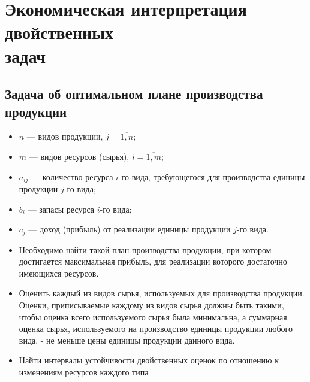 \documentclass[17pt]{extarticle}
\begin{document}
\section{Экономическая интерпретация двойственных \\ задач}
\subsection{Задача об оптимальном плане производства продукции}
\begin{itemize}
    \item \( n \) — видов продукции, \( j = \overline{1, n} \);
    \item \( m \) — видов ресурсов (сырья), \( i = \overline{1, m} \);
    \item \( a_{ij} \) — количество ресурса \( i \)-го вида, требующегося для производства единицы продукции \( j \)-го вида;
    \item \( b_i \) — запасы ресурса \( i \)-го вида;
    \item \( c_j \) — доход (прибыль) от реализации единицы продукции \( j \)-го вида.
    \item Необходимо найти такой план производства продукции, при котором достигается максимальная прибыль,
          для реализации которого достаточно имеющихся ресурсов.
    \item Оценить каждый из видов сырья, используемых для производства продукции.
          Оценки, приписываемые каждому из видов сырья должны быть такими, чтобы оценка всего используемого сырья была минимальна,
          а суммарная оценка сырья, используемого на производство единицы продукции любого вида, - не меньше цены единицы продукции данного вида.
    \item Найти интервалы устойчивости двойственных оценок по отношению к изменениям ресурсов каждого типа
\end{itemize}
\end{document}
